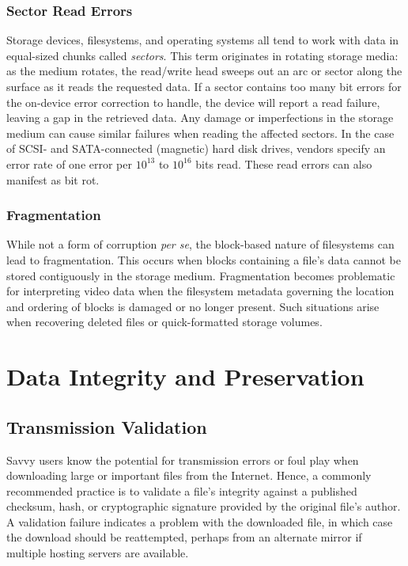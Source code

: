 \subsubsection{Sector Read Errors}

Storage devices, filesystems, and operating systems all tend to work with data in equal-sized chunks called \emph{sectors}. This term originates in rotating storage media: as the medium rotates, the read/write head sweeps out an arc or sector along the surface as it reads the requested data. If a sector contains too many bit errors for the on-device error correction to handle, the device will report a read failure, leaving a gap in the retrieved data. Any damage or imperfections in the storage medium can cause similar failures when reading the affected sectors. In the case of SCSI- and SATA-connected (magnetic) hard disk drives, vendors specify an error rate of one error per \( 10^{13} \) to \( 10^{16} \) bits read. \cite{gray2007} These read errors can also manifest as bit rot.

\subsubsection{Fragmentation}

While not a form of corruption \emph{per se}, the block-based nature of filesystems can lead to fragmentation. This occurs when blocks containing a file's data cannot be stored contiguously in the storage medium. Fragmentation becomes problematic for interpreting video data when the filesystem metadata governing the location and ordering of blocks is damaged or no longer present. Such situations arise when recovering deleted files or quick-formatted storage volumes.

\section{Data Integrity and Preservation}

\subsection{Transmission Validation}

Savvy users know the potential for transmission errors or foul play when downloading large or important files from the Internet. Hence, a commonly recommended practice is to validate a file's integrity against a published checksum, hash, or cryptographic signature provided by the original file's author. A validation failure indicates a problem with the downloaded file, in which case the download should be reattempted, perhaps from an alternate mirror if multiple hosting servers are available.

